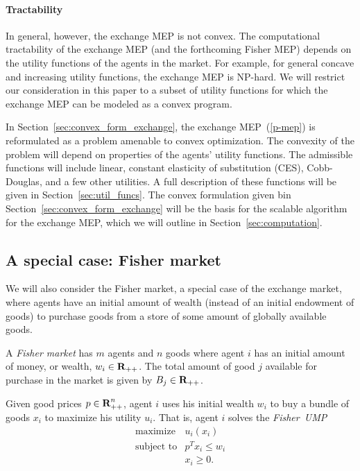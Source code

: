 \documentclass[12pt]{article}
\begin{document}
\paragraph{Tractability}
In general, however, the exchange MEP is not convex.
The computational tractability of the exchange MEP
(and the forthcoming Fisher MEP) depends on the utility functions of
the agents in the market.
For example, for general concave and increasing utility functions,
the exchange MEP is NP-hard. %
We will restrict our consideration in this paper to a subset of utility
functions for which the exchange MEP can be modeled as a convex program.

In Section~\ref{sec:convex_form_exchange}, the exchange MEP~(\ref{p-mep})
is reformulated as a problem amenable to convex optimization.
The convexity of the problem will depend on properties of the
agents' utility functions.
The admissible functions will include linear, constant elasticity
of substitution (CES), Cobb-Douglas, and a few other utilities.
A full description of these functions will be given in Section~\ref{sec:util_funcs}.
The convex formulation given bin Section~\ref{sec:convex_form_exchange} will
be the basis for the scalable algorithm for the exchange MEP, which
we will outline in Section~\ref{sec:computation}.



\subsection{A special case: Fisher market}

We will also consider the Fisher market, a special case of the exchange market, where agents have an initial amount of wealth (instead of an initial endowment of goods)
to purchase goods from a store of some amount of globally available goods.


A \emph{Fisher market} has $m$ agents and $n$ goods where
agent $i$ has an initial amount of money, or wealth, $w_i \in {\mbox{\bf R}}_{++}$.
The total amount of good $j$ available for purchase in the market is given by
$B_j \in {\mbox{\bf R}}_{++}$.

Given good prices $p \in {\mbox{\bf R}}^n_{++}$, agent $i$ uses his initial
wealth $w_i$ to buy a bundle of goods $x_i$ to maximize his utility $u_i$.
That is, agent $i$ solves the \emph{Fisher~UMP}
\begin{equation}
\label{p-fisher-ump}
\begin{array}{ll}
\mbox{maximize} & u_i(x_i) \\
\mbox{subject to} & p^T x_i \leq w_i \\
& x_i \geq 0.
\end{array}
\end{equation}
\end{document}
